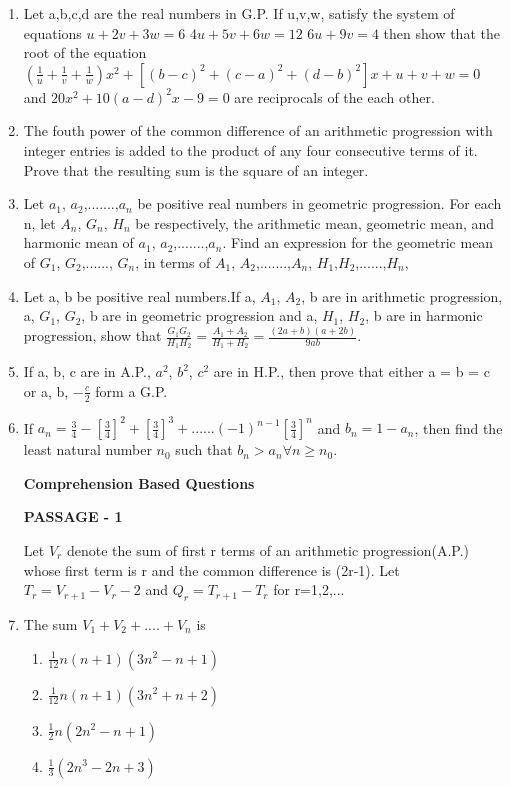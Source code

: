 \begin{enumerate}[label=\arabic*.,ref=\thesubsection.\theenumi]
\item Let a,b,c,d are the real numbers in G.P. If u,v,w, satisfy the system of equations $u+2v+3w=6$ $4u+5v+6w=12$ $6u+9v=4$ then show that the root of the equation $(\frac{1}{u}+\frac{1}{v}+\frac{1}{w})x^2+[(b-c)^2+(c-a)^2+(d-b)^2]x+u+v+w=0$ and $20x^2+10(a-d)^2x-9=0$ are reciprocals of the each other. 
\item The fouth power of the common difference of an arithmetic progression with integer entries is added to the product of any four consecutive terms of it. Prove that the resulting sum is the square of an integer.
\item Let $a_1$, $a_2$,.......,$a_n$ be positive real numbers in geometric progression. For each n, let $A_n$, $G_n$, $H_n$ be respectively, the arithmetic mean, geometric mean, and harmonic mean of $a_1$, $a_2$,.......,$a_n$. Find an expression for the geometric mean of $G_1$, $G_2$,......, $G_n$, in terms of $A_1$, $A_2$,.......,$A_n$,  $H_1$,$H_2$,......,$H_n$,
\item Let a, b be positive real numbers.If a, $A_1$, $A_2$, b are in arithmetic progression, a, $G_1$, $G_2$, b are in geometric progression and a, $H_1$, $H_2$, b are in harmonic progression, show that $\frac{G_1G_2}{H_1H_2}=\frac{A_1+A_2}{H_1+H_2}=\frac{(2a+b)(a+2b)}{9ab}$.
\item If a, b, c are in A.P., $a^2$, $b^2$, $c^2$ are in H.P., then prove that either a = b = c or a, b, $-\frac{c}{2}$ form a G.P.
\item If $a_n=\frac{3}{4}-[\frac{3}{4}]^2+[\frac{3}{4}]^3+......(-1)^{n-1} [\frac{3}{4}]^n$ and $b_n = 1- a_n$, then find the least natural number $n_0$ such that $b_n > a_n \forall  n \geq n_0$.

\textbf{Comprehension Based Questions}
                               
\textbf {{PASSAGE - 1}}

Let $V_r$ denote the sum of first r terms of an arithmetic progression(A.P.) whose first term is r and the common difference is (2r-1). Let $T_r=V_{r+1}-V_r-2$ and $Q_r=T_{r+1}-T_r$ for r=1,2,...

\item The sum $V_1+V_2+....+V_n$ is

\begin{enumerate}
\item $\frac{1}{12}n(n+1)(3n^2-n+1)$   
\item $\frac{1}{12}n(n+1)(3n^2+n+2)$  
\item $\frac{1}{2}n(2n^2-n+1)$   
\item $\frac{1}{3}(2n^3-2n+3)$
\end{enumerate}


\end{enumerate}
